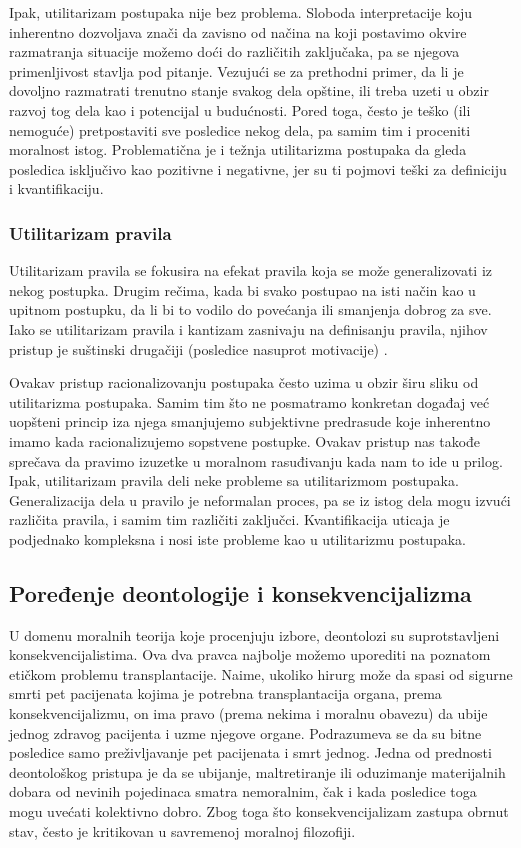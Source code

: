 \documentclass[a4paper]{article}
\begin{document}
Ipak, utilitarizam postupaka nije bez problema. Sloboda interpretacije koju inherentno dozvoljava znači da zavisno od načina na koji postavimo okvire razmatranja situacije možemo doći do različitih zaključaka, pa se njegova primenljivost stavlja pod pitanje. Vezujući se za prethodni primer, da li je dovoljno razmatrati trenutno stanje svakog dela opštine, ili treba uzeti u obzir razvoj tog dela kao i potencijal u budućnosti. Pored toga, često je teško (ili nemoguće) pretpostaviti sve posledice nekog dela, pa samim tim i proceniti moralnost istog. Problematična je i težnja utilitarizma postupaka da gleda posledica isključivo kao pozitivne i negativne, jer su ti pojmovi teški za definiciju i kvantifikaciju. 

\subsubsection{Utilitarizam pravila}
Utilitarizam pravila se fokusira na efekat pravila koja se može generalizovati iz nekog postupka. Drugim rečima, kada bi svako postupao na isti način kao u upitnom postupku, da li bi to vodilo do povećanja ili smanjenja dobrog za sve. Iako se utilitarizam pravila i kantizam zasnivaju na definisanju pravila, njihov pristup je suštinski drugačiji (posledice nasuprot motivacije) \cite{quinn-ethics}. 

Ovakav pristup racionalizovanju postupaka često uzima u obzir širu sliku od utilitarizma postupaka. Samim tim što ne posmatramo konkretan događaj već uopšteni princip iza njega smanjujemo subjektivne predrasude koje inherentno imamo kada racionalizujemo sopstvene postupke. Ovakav pristup nas takođe sprečava da pravimo izuzetke u moralnom rasuđivanju kada nam to ide u prilog. 
Ipak, utilitarizam pravila deli neke probleme sa utilitarizmom postupaka. Generalizacija dela u pravilo je neformalan proces, pa se iz istog dela mogu izvući različita pravila, i samim tim različiti zaključci. Kvantifikacija uticaja je podjednako kompleksna i nosi iste probleme kao u utilitarizmu postupaka. 

\subsection{Poređenje deontologije i konsekvencijalizma}
U domenu moralnih teorija koje procenjuju izbore, deontolozi su suprotstavljeni konsekvencijalistima. Ova dva pravca najbolje možemo uporediti na poznatom etičkom problemu transplantacije. Naime, ukoliko hirurg može da spasi od sigurne smrti pet pacijenata kojima je potrebna transplantacija organa, prema konsekvencijalizmu, on ima pravo (prema nekima i moralnu obavezu) da ubije jednog zdravog pacijenta i uzme njegove organe. Podrazumeva se da su bitne posledice samo preživljavanje pet pacijenata i smrt jednog.
Jedna od prednosti deontološkog pristupa je da se ubijanje, maltretiranje ili oduzimanje materijalnih dobara od nevinih pojedinaca smatra nemoralnim, čak i kada posledice toga mogu uvećati kolektivno dobro. Zbog toga što konsekvencijalizam zastupa obrnut stav, često je kritikovan u savremenoj moralnoj filozofiji.
\end{document}
